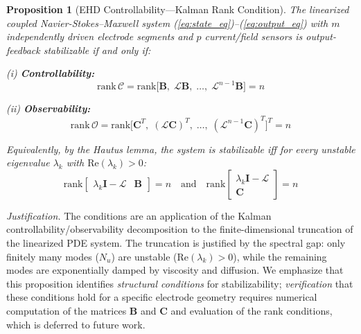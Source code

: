 \documentclass[12pt,twocolumn]{article}
\newtheorem{proposition}[theorem]{Proposition}
\newcommand{\Lop}{\mathcal{L}}
\begin{document}
\begin{proposition}[EHD Controllability---Kalman Rank Condition]
\label{thm:controllability}
The linearized coupled Navier-Stokes--Maxwell system
\textnormal{(\ref{eq:state_eq})--(\ref{eq:output_eq})} with $m$
independently driven electrode segments and $p$ current/field sensors
is output-feedback stabilizable if and only if:

\noindent\textnormal{(i)} \textbf{Controllability:}
\begin{equation}
  \mathrm{rank}\,\mathcal{C}
  = \mathrm{rank}\bigl[\mathbf{B},\; \Lop\mathbf{B},\;
    \ldots,\; \Lop^{n-1}\mathbf{B}\bigr] = n
  \label{eq:controllability_rank}
\end{equation}

\noindent\textnormal{(ii)} \textbf{Observability:}
\begin{equation}
  \mathrm{rank}\,\mathcal{O}
  = \mathrm{rank}\bigl[\mathbf{C}^T,\;
    (\Lop\mathbf{C})^T,\; \ldots,\;
    (\Lop^{n-1}\mathbf{C})^T\bigr]^T = n
  \label{eq:observability_rank}
\end{equation}

\noindent
Equivalently, by the Hautus lemma, the system is stabilizable
iff for every unstable eigenvalue $\lambda_k$ with
$\mathrm{Re}(\lambda_k) > 0$:
\begin{equation}
  \mathrm{rank}\begin{bmatrix}
    \lambda_k \mathbf{I} - \Lop & \mathbf{B}
  \end{bmatrix} = n
  \quad \text{and} \quad
  \mathrm{rank}\begin{bmatrix}
    \lambda_k \mathbf{I} - \Lop \\ \mathbf{C}
  \end{bmatrix} = n
  \label{eq:hautus}
\end{equation}
\end{proposition}

\textit{Justification.}
The conditions are an application of the Kalman
controllability/observability decomposition \cite{Kalman1960} to the
finite-dimensional truncation of the linearized PDE system. The
truncation is justified by the spectral gap: only finitely many modes
($N_u$) are unstable ($\mathrm{Re}(\lambda_k) > 0$), while the
remaining modes are exponentially damped by viscosity and diffusion.
We emphasize that this proposition identifies \emph{structural
conditions} for stabilizability; \emph{verification} that these
conditions hold for a specific electrode geometry requires numerical
computation of the matrices $\mathbf{B}$ and $\mathbf{C}$ and
evaluation of the rank conditions, which is deferred to future work.
\end{document}
